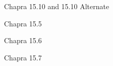 \documentclass{article}
\begin{document}
\begin{figure}[htb!]
\begin{center}
\caption{Chapra 15.10 and 15.10 Alternate}
\end{center}
\end{figure}

\begin{figure}[htb!]
\begin{center}
\caption{Chapra 15.5}
\end{center}
\end{figure}

\begin{figure}[htb!]
\begin{center}
\caption{Chapra 15.6}
\end{center}
\end{figure}

\begin{figure}[htb!]
\begin{center}
\caption{Chapra 15.7}
\end{center}
\end{figure}
\end{document}
